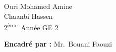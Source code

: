 \begin{titlepage}
\begin{center}
Ouri Mohamed Amine \\ Chaanbi Hassen \\[0.5cm]
    {\large 2\textsuperscript{ème}~Année GE 2}\\[0.5cm]
    
\bigskip


\bigskip    
      \textbf{Encadré par :}
    Mr.~Bouani Faouzi \\[0.5cm]
\bigskip   %
\bigskip
\vfill
{ }\\
\end{center}
\newpage
\begin{center}
    \setlength{\fboxrule}{2.5pt}
    \setlength{\fboxsep}{20pt}
\end{center}
\end{titlepage}